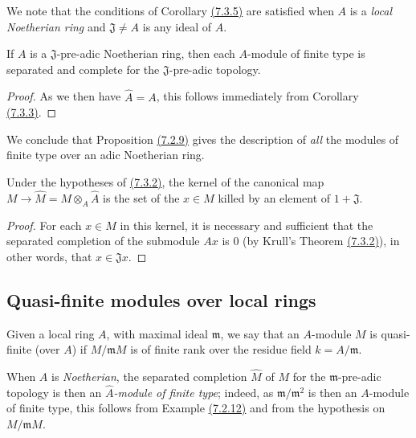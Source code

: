 We note that the conditions of Corollary \hyperref[cor-0.7.3.5]{(7.3.5)} are satisfied
when $A$ is a {\em local Noetherian ring} and $\mathfrak{J}\neq A$ is any ideal of $A$.

\begin{cor}[7.3.6]
\label{cor-0.7.3.6}
If $A$ is a $\mathfrak{J}$-pre-adic Noetherian ring, then each $A$-module of finite type
is separated and complete for the $\mathfrak{J}$-pre-adic topology.
\end{cor}

\begin{proof}
\label{proof-cor-0.7.3.6}
As we then have $\widehat{A}=A$, this follows immediately from
Corollary \hyperref[cor-0.7.3.3]{(7.3.3)}.
\end{proof}

We conclude that Proposition \hyperref[prop-0.7.2.9]{(7.2.9)} gives the description of
{\em all} the modules of finite type over an adic Noetherian ring.

\begin{cor}[7.3.7]
\label{cor-0.7.3.7}
Under the hypotheses of \hyperref[thm-0.7.3.2]{(7.3.2)}, the kernel of the canonical map
$M\to\widehat{M}=M\otimes_A\widehat{A}$ is the set of the $x\in M$ killed by an element of
$1+\mathfrak{J}$.
\end{cor}

\begin{proof}
\label{proof-cor-0.7.3.7}
For each $x\in M$ in this kernel, it is necessary and sufficient that the separated
completion of the submodule $Ax$ is $0$
(by Krull's Theorem \hyperref[thm-0.7.3.2]{(7.3.2)}), in other words, that
$x\in\mathfrak{J}x$.
\end{proof}

\subsection{Quasi-finite modules over local rings}
\label{subsection-quasi-finite-modules-over-local-rings}

\begin{defn}[7.4.1]
\label{defn-0.7.4.1}
Given a local ring $A$, with maximal ideal $\mathfrak{m}$, we say that an $A$-module $M$
is quasi-finite (over $A$) if $M/\mathfrak{m}M$ is of finite rank over the residue field
$k=A/\mathfrak{m}$.
\end{defn}

When $A$ is {\em Noetherian}, the separated completion $\widehat{M}$ of $M$ for the
$\mathfrak{m}$-pre-adic topology is then an {\em $\widehat{A}$-module of finite type};
indeed, as $\mathfrak{m}/\mathfrak{m}^2$ is then an $A$-module of finite type, this follows
from Example \hyperref[exm-0.7.2.12]{(7.2.12)} and from the hypothesis on $M/\mathfrak{m}M$.

